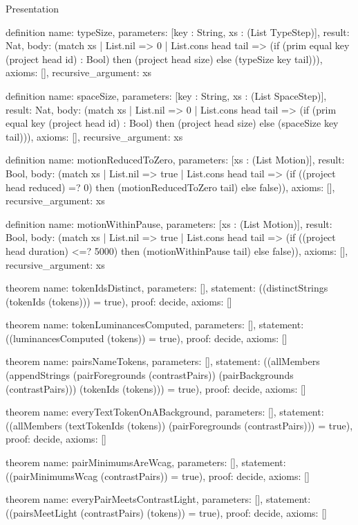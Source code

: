 \begin{lexlean}{Presentation}
\begin{semanticmodule}
definition{
  name: typeSize,
  parameters: [key : String, xs : (List TypeStep)],
  result: Nat,
  body: (match xs
    | List.nil => 0
    | List.cons head tail => (if (prim equal key (project head id) : Bool) then (project head size) else (typeSize key tail))),
  axioms: [],
  recursive_argument: xs
}

definition{
  name: spaceSize,
  parameters: [key : String, xs : (List SpaceStep)],
  result: Nat,
  body: (match xs
    | List.nil => 0
    | List.cons head tail => (if (prim equal key (project head id) : Bool) then (project head size) else (spaceSize key tail))),
  axioms: [],
  recursive_argument: xs
}

definition{
  name: motionReducedToZero,
  parameters: [xs : (List Motion)],
  result: Bool,
  body: (match xs
    | List.nil => true
    | List.cons head tail => (if ((project head reduced) =? 0) then (motionReducedToZero tail) else false)),
  axioms: [],
  recursive_argument: xs
}

definition{
  name: motionWithinPause,
  parameters: [xs : (List Motion)],
  result: Bool,
  body: (match xs
    | List.nil => true
    | List.cons head tail => (if ((project head duration) <=? 5000) then (motionWithinPause tail) else false)),
  axioms: [],
  recursive_argument: xs
}

theorem{
  name: tokenIdsDistinct,
  parameters: [],
  statement: ((distinctStrings (tokenIds (tokens))) = true),
  proof: decide{},
  axioms: []
}

theorem{
  name: tokenLuminancesComputed,
  parameters: [],
  statement: ((luminancesComputed (tokens)) = true),
  proof: decide{},
  axioms: []
}

theorem{
  name: pairsNameTokens,
  parameters: [],
  statement: ((allMembers (appendStrings (pairForegrounds (contrastPairs)) (pairBackgrounds (contrastPairs))) (tokenIds (tokens))) = true),
  proof: decide{},
  axioms: []
}

theorem{
  name: everyTextTokenOnABackground,
  parameters: [],
  statement: ((allMembers (textTokenIds (tokens)) (pairForegrounds (contrastPairs))) = true),
  proof: decide{},
  axioms: []
}

theorem{
  name: pairMinimumsAreWcag,
  parameters: [],
  statement: ((pairMinimumsWcag (contrastPairs)) = true),
  proof: decide{},
  axioms: []
}

theorem{
  name: everyPairMeetsContrastLight,
  parameters: [],
  statement: ((pairsMeetLight (contrastPairs) (tokens)) = true),
  proof: decide{},
  axioms: []
}


\end{semanticmodule}
\end{lexlean}
